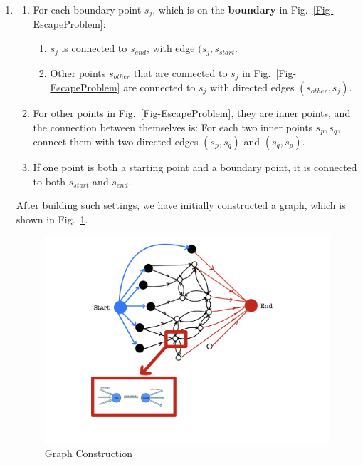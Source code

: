 \documentclass[12pt,a4paper]{article}
\makeatletter
\newtheorem*{solution}{Solution}
\theoremstyle{definition}
\renewenvironment{solution}[1][Solution] {\par\pushQED{\qed}\normalfont\topsep6\p@\@plus6\p@\relax\trivlist\item[\hskip\labelsep\bfseries#1\@addpunct{.}]\ignorespaces}{\popQED\endtrivlist\@endpefalse} \makeatother
\makeatother
\begin{document}
\begin{enumerate}
\begin{enumerate}
\begin{solution}
\begin{enumerate}
\begin{enumerate}
            
             \end{enumerate}
            \item For each boundary point $s_j$, which is on the \textbf{boundary} in Fig.~\ref{Fig-EscapeProblem}:
            \begin{enumerate}
                \item 
           $s_j$ is connected to $s_{end}$, with edge $(s_j, s_{start}$.
           \item
           Other points $s_{other}$ that are connected  to $s_j$ in Fig.~\ref{Fig-EscapeProblem} are connected to $s_j$ with directed edges $(s_{other}, s_j)$.
            \end{enumerate}
            
        \item For other points in Fig.~\ref{Fig-EscapeProblem}, they are inner points, and the connection between themselves is: For each two inner points $s_p,s_q$, connect them with two directed edges $(s_p,s_q)$ and $(s_q,s_p)$. 
        \item If one point is both a starting point and a boundary point, it is connected to both $s_{start}$ and $s_{end}$.
        \end{enumerate}
        After building such settings, we have initially constructed a graph, which is shown in Fig.~\ref{graph}.
        
        \begin{figure}[htbp]
            \centering
            \includegraphics[width=13cm]{3.jpg}
            \caption{Graph Construction}
            \label{graph}
        \end{figure}
        

\end{solution}
\end{enumerate}
\end{enumerate}
\end{document}
